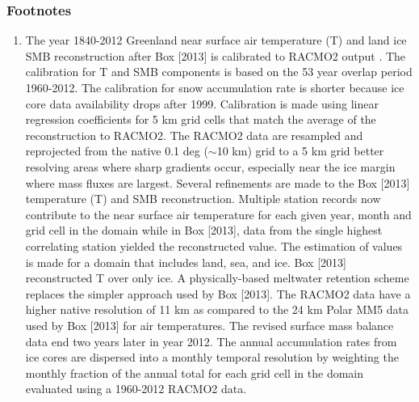 \subsubsection{Footnotes} %
\begin{enumerate}
	\item \small{The year 1840-2012 Greenland near surface air temperature (T) and land ice SMB reconstruction after Box [2013] is calibrated to RACMO2 output \citep{Meijgaard2008,Ettema2009,Broeke2009,Angelen2011}. The calibration for T and SMB components is based on the 53 year overlap period 1960-2012. The calibration for snow accumulation rate is shorter because ice core data availability drops after 1999. Calibration is made using linear regression coefficients for 5 km grid cells that match the average of the reconstruction to RACMO2. The RACMO2 data are resampled and reprojected from the native 0.1 deg ($\sim$10 km) grid to a 5 km grid better resolving areas where sharp gradients occur, especially near the ice margin where mass fluxes are largest. Several refinements are made to the Box [2013] temperature (T) and SMB reconstruction. Multiple station records now contribute to the near surface air temperature for each given year, month and grid cell in the domain while in Box [2013], data from the single highest correlating station yielded the reconstructed value. The estimation of values is made for a domain that includes land, sea, and ice. Box [2013] reconstructed T over only ice. A physically-based meltwater retention scheme \citep{Pfeffer1990,Pfeffer1991} replaces the simpler approach used by Box [2013]. The RACMO2 data have a higher native resolution of 11 km as compared to the 24 km Polar MM5 data used by Box [2013] for air temperatures. The revised surface mass balance data end two years later in year 2012. The annual accumulation rates from ice cores are dispersed into a monthly temporal resolution by weighting the monthly fraction of the annual total for each grid cell in the domain evaluated using a 1960-2012 RACMO2 data.}
\end{enumerate}

\clearpage %
